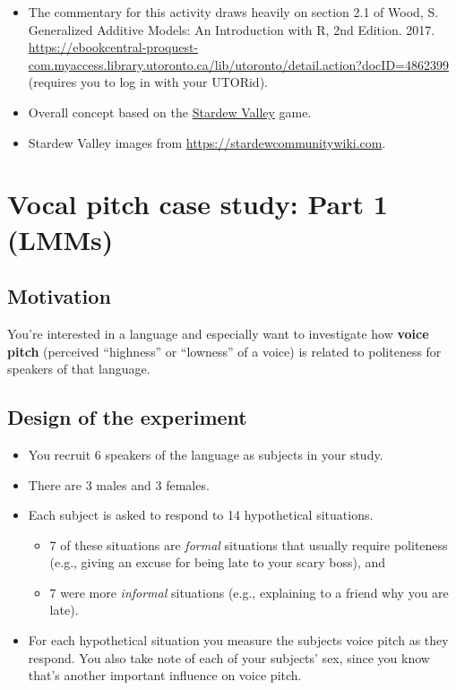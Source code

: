 \documentclass[
  openany]{book}
\providecommand{\tightlist}{%
  \setlength{\itemsep}{0pt}\setlength{\parskip}{0pt}}
\begin{document}
\begin{itemize}
\tightlist
\item
  The commentary for this activity draws heavily on section 2.1 of
  Wood, S. Generalized Additive Models: An Introduction with R, 2nd Edition. 2017. \url{https://ebookcentral-proquest-com.myaccess.library.utoronto.ca/lib/utoronto/detail.action?docID=4862399} (requires you to log in with your UTORid).
\item
  Overall concept based on the \href{https://www.stardewvalley.net/}{Stardew Valley} game.
\item
  Stardew Valley images from \url{https://stardewcommunitywiki.com}.
\end{itemize}

\hypertarget{vocal-pitch-case-study-part-1-lmms}{%
\section{Vocal pitch case study: Part 1 (LMMs)}\label{vocal-pitch-case-study-part-1-lmms}}

\hypertarget{motivation}{%
\subsection{Motivation}\label{motivation}}

You're interested in a language and especially want to investigate how \textbf{voice pitch} (perceived ``highness'' or ``lowness'' of a voice) is related to politeness for speakers of that language.

\hypertarget{design-of-the-experiment}{%
\subsection{Design of the experiment}\label{design-of-the-experiment}}

\begin{itemize}
\tightlist
\item
  You recruit 6 speakers of the language as subjects in your study.
\item
  There are 3 males and 3 females.
\item
  Each subject is asked to respond to 14 hypothetical situations.

  \begin{itemize}
  \tightlist
  \item
    7 of these situations are \emph{formal} situations that usually require politeness (e.g., giving an excuse for being late to your scary boss), and
  \item
    7 were more \emph{informal} situations (e.g., explaining to a friend why you are late).
  \end{itemize}
\item
  For each hypothetical situation you measure the subjects voice pitch as they respond. You also take note of each of your subjects' sex, since you know that's another important influence on voice pitch.
\end{itemize}
\end{document}
